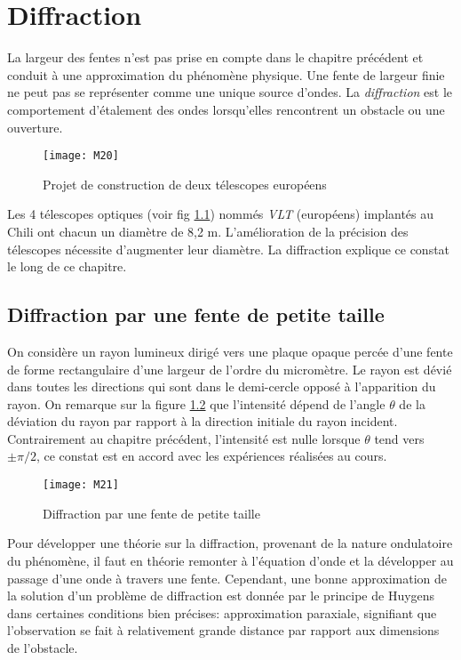 \chapter{Diffraction} %

La largeur des fentes n'est pas prise en compte dans le chapitre précédent et conduit à une approximation du phénomène physique. Une fente de largeur finie ne peut pas se représenter comme une unique source d'ondes. La \textit{diffraction} est le comportement d'étalement des ondes lorsqu’elles rencontrent un obstacle ou une ouverture.

\begin{figure}[h]
    \centering
    \texttt{[image: M20]}
    \caption{Projet de construction de deux télescopes européens}
    \label{tele}
\end{figure}

\noindent Les 4 télescopes optiques (voir fig \ref{tele})
nommés \textit{VLT} (européens) implantés au Chili ont chacun un diamètre de 8,2 m.
L'amélioration de la précision des télescopes nécessite d'augmenter leur diamètre. La diffraction explique ce constat le long de ce chapitre.

\section{Diffraction par une fente de petite taille}

On considère un rayon lumineux dirigé vers une plaque opaque percée d'une fente de forme rectangulaire d'une largeur de l'ordre du micromètre. Le rayon est dévié dans toutes les directions qui sont dans le demi-cercle opposé à l'apparition du rayon. On remarque sur la figure \ref{d1} que l'intensité dépend de l'angle $\theta$ de la déviation du rayon par rapport à la direction initiale du rayon incident. Contrairement au chapitre précédent, l'intensité est nulle lorsque $\theta$ tend vers $\pm \pi/2$, ce constat est en accord avec les expériences réalisées au cours.

\begin{figure}[h]
    \centering
    \texttt{[image: M21]}
    \caption{Diffraction par une fente de petite taille}
    \label{d1}
\end{figure}

Pour développer une théorie sur la diffraction, provenant de la nature ondulatoire du phénomène, il faut en théorie remonter à l'équation d'onde et la développer au passage d'une onde à travers une fente. Cependant, une bonne approximation de la solution d'un problème de diffraction est donnée par le principe de Huygens dans certaines conditions bien précises: approximation paraxiale, signifiant que l'observation se fait à relativement grande distance par rapport aux dimensions de l'obstacle. 

